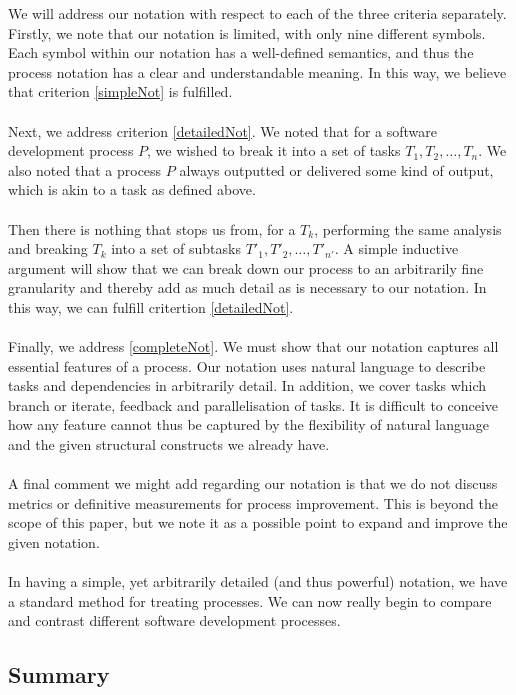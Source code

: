 We will address our notation with respect to each of the three criteria separately.
Firstly, we note that our notation is limited, with only nine different symbols.
Each symbol within our notation has a well-defined semantics, and thus the process notation has a
clear and understandable meaning.
In this way, we believe that criterion \ref{simpleNot} is fulfilled.\\
\\
Next, we address criterion \ref{detailedNot}.
We noted that for a software development process $P$, we wished to break it into a set of tasks
$T_1, T_2, \ldots, T_n$.
We also noted that a process $P$ always outputted or delivered some kind of output, which is akin to
a task as defined above.\\
\\
Then there is nothing that stops us from, for a $T_k$, performing the same analysis and breaking
$T_k$ into a set of subtasks $T'_1, T'_2, \ldots, T'_{n'}$.
A simple inductive argument will show that we can break down our process to an arbitrarily fine
granularity and thereby add as much detail as is necessary to our notation.
In this way, we can fulfill critertion \ref{detailedNot}.\\
\\
Finally, we address \ref{completeNot}.
We must show that our notation captures all essential features of a process.
Our notation uses natural language to describe tasks and dependencies in arbitrarily detail.
In addition, we cover tasks which branch or iterate, feedback and parallelisation of tasks.
It is difficult to conceive how any feature cannot thus be captured by the flexibility of natural
language and the given structural constructs we already have.\\
\\
A final comment we might add regarding our notation is that we do not discuss metrics or
definitive measurements for process improvement.
This is beyond the scope of this paper, but we note it as a possible point to expand and improve the
given notation.\\
\\
In having a simple, yet arbitrarily detailed (and thus powerful) notation, we have a standard method
for treating processes.
We can now really begin to compare and contrast different software development processes.

\pagebreak

\subsection{Summary}

